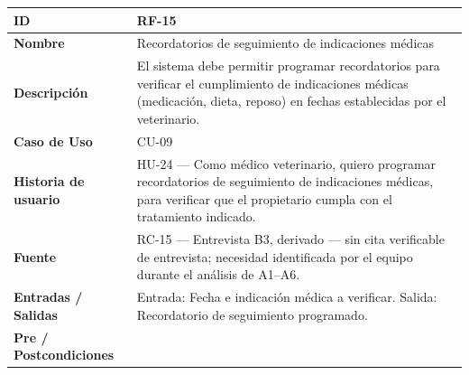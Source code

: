 \documentclass[
]{article}
\newcounter{none} %
\begin{document}
{\def\LTcaptype{none} %
\begin{longtable}[]{|
  >{\raggedright\arraybackslash}p{}|
  >{\raggedright\arraybackslash}p{}|}
\hline
\begin{minipage}[b]{\linewidth}\raggedright
\textbf{ID}
\end{minipage} & \begin{minipage}[b]{\linewidth}\raggedright
RF-15
\end{minipage} \\
\hline
\endhead
\hline
\endlastfoot
\textbf{Nombre} & \begin{minipage}[t]{\linewidth}\raggedright
Recordatorios de seguimiento de indicaciones médicas
\end{minipage} \\
\hline
\textbf{Descripción} & \begin{minipage}[t]{\linewidth}\raggedright
El sistema debe permitir programar recordatorios para verificar el cumplimiento de indicaciones médicas (medicación, dieta, reposo) en fechas establecidas por el veterinario.
\end{minipage} \\
\hline
\textbf{Caso de Uso} & \begin{minipage}[t]{\linewidth}\raggedright
CU-09
\end{minipage} \\
\hline
\textbf{Historia de usuario} & \begin{minipage}[t]{\linewidth}\raggedright
HU-24 — Como médico veterinario, quiero programar recordatorios de seguimiento de indicaciones médicas, para verificar que el propietario cumpla con el tratamiento indicado.
\end{minipage} \\
\hline
\textbf{Fuente} & \begin{minipage}[t]{\linewidth}\raggedright
RC-15 — Entrevista B3, derivado — sin cita verificable de entrevista; necesidad identificada por el equipo durante el análisis de A1–A6.
\end{minipage} \\
\hline
\textbf{Entradas / Salidas} & \begin{minipage}[t]{\linewidth}\raggedright
Entrada: Fecha e indicación médica a verificar. Salida: Recordatorio de seguimiento programado.
\end{minipage} \\
\hline
\textbf{Pre / Postcondiciones} & \begin{minipage}[t]{\linewidth}\raggedright

\end{minipage}
\end{longtable}}
\end{document}
